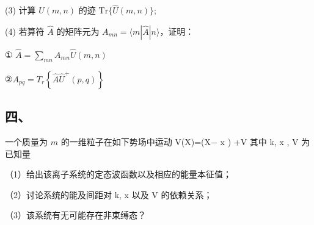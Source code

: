 (3) 计算 $\hat{U}(m,n)$ 的迹 $\mathrm{Tr}\{\hat{U}(m,n)\}$;

(4) 若算符 $\hat{A}$ 的矩阵元为 $A_{mn} = \langle m|\hat{A}|n\rangle$，证明：

① $\hat{A} =\sum_{mn} A_{mn} \hat{U}(m,n)$

②$A_{pq} =T_r\left\{\hat{A}\hat{U}^+(p,q)\right\}$
\subsection{四、}
一个质量为 $m$ 的一维粒子在如下势场中运动
$$V(X)=(X− x  )  +V
其中 k, x  , V 为已知量

（1）给出该离子系统的定态波函数以及相应的能量本征值；

（2）讨论系统的能及间距对 k, x  以及 V 的依赖关系；

（3）该系统有无可能存在非束缚态？
